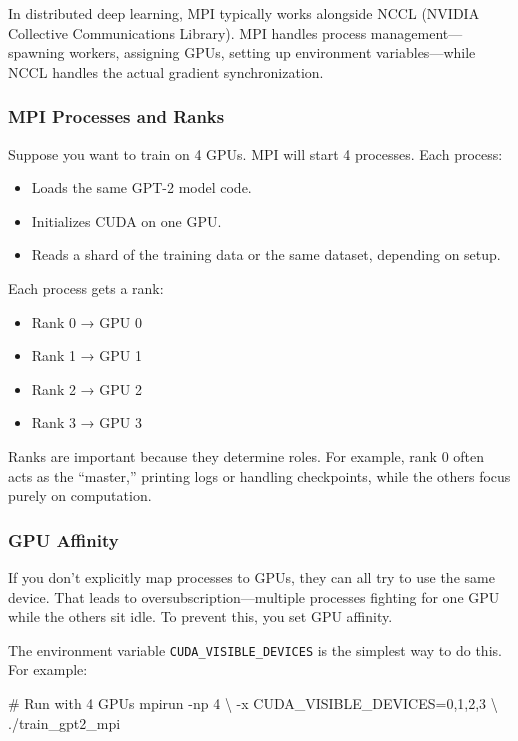 \documentclass[
  letterpaper,
  DIV=11,
  numbers=noendperiod]{scrreprt}
\newenvironment{Shaded}{\begin{snugshade}}{\end{snugshade}}
\newcommand{\AttributeTok}[1]{\textcolor[rgb]{0.40,0.45,0.13}{#1}}
\newcommand{\CommentTok}[1]{\textcolor[rgb]{0.37,0.37,0.37}{#1}}
\newcommand{\DataTypeTok}[1]{\textcolor[rgb]{0.68,0.00,0.00}{#1}}
\newcommand{\ExtensionTok}[1]{\textcolor[rgb]{0.00,0.23,0.31}{#1}}
\newcommand{\NormalTok}[1]{\textcolor[rgb]{0.00,0.23,0.31}{#1}}
\providecommand{\tightlist}{%
  \setlength{\itemsep}{0pt}\setlength{\parskip}{0pt}}
\begin{document}
In distributed deep learning, MPI typically works alongside NCCL (NVIDIA
Collective Communications Library). MPI handles process
management---spawning workers, assigning GPUs, setting up environment
variables---while NCCL handles the actual gradient synchronization.

\subsubsection{MPI Processes and Ranks}\label{mpi-processes-and-ranks}

Suppose you want to train on 4 GPUs. MPI will start 4 processes. Each
process:

\begin{itemize}
\tightlist
\item
  Loads the same GPT-2 model code.
\item
  Initializes CUDA on one GPU.
\item
  Reads a shard of the training data or the same dataset, depending on
  setup.
\end{itemize}

Each process gets a rank:

\begin{itemize}
\tightlist
\item
  Rank 0 → GPU 0
\item
  Rank 1 → GPU 1
\item
  Rank 2 → GPU 2
\item
  Rank 3 → GPU 3
\end{itemize}

Ranks are important because they determine roles. For example, rank 0
often acts as the ``master,'' printing logs or handling checkpoints,
while the others focus purely on computation.

\subsubsection{GPU Affinity}\label{gpu-affinity}

If you don't explicitly map processes to GPUs, they can all try to use
the same device. That leads to oversubscription---multiple processes
fighting for one GPU while the others sit idle. To prevent this, you set
GPU affinity.

The environment variable \texttt{CUDA\_VISIBLE\_DEVICES} is the simplest
way to do this. For example:

\begin{Shaded}
\begin{Highlighting}[]
\CommentTok{\# Run with 4 GPUs}
\ExtensionTok{mpirun} \AttributeTok{{-}np}\NormalTok{ 4 }\DataTypeTok{\textbackslash{}}
  \AttributeTok{{-}x}\NormalTok{ CUDA\_VISIBLE\_DEVICES=0,1,2,3 }\DataTypeTok{\textbackslash{}}
\NormalTok{  ./train\_gpt2\_mpi}
\end{Highlighting}
\end{Shaded}
\end{document}
